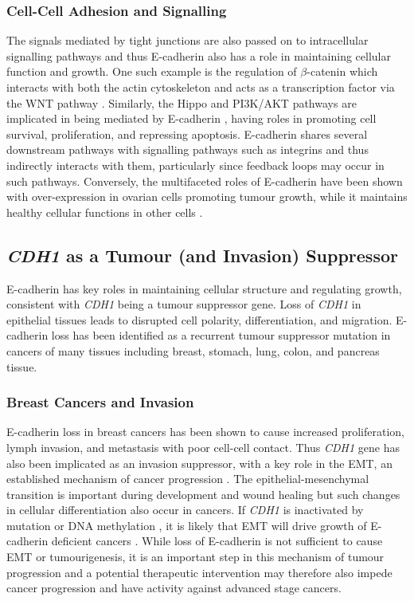 \subsubsection{Cell-Cell Adhesion and Signalling}
The signals mediated by tight junctions are also passed on to intracellular signalling pathways and thus \gls{E-cadherin} also has a role in maintaining cellular function and growth. One such example is the regulation of $\beta$-catenin which interacts with both the actin cytoskeleton and acts as a transcription factor via the \gls{WNT} pathway \citep{Jeanes2008}. Similarly, the Hippo and \gls{PI3K}/AKT pathways are implicated in being mediated by \gls{E-cadherin} \citep{DeSantis2009, Kim2011}, having roles in promoting cell survival, proliferation, and repressing apoptosis. \gls{E-cadherin} shares several downstream pathways with signalling pathways such as integrins and thus indirectly interacts with them, particularly since feedback loops may occur in such pathways. Conversely, the multifaceted roles of \gls{E-cadherin} have been shown with over-expression in ovarian cells promoting tumour growth, while it maintains healthy cellular functions in other cells \citep{Dong2012, Brouxhon2014}.


\subsection{\textit{CDH1} as a Tumour (and Invasion) Suppressor}
\gls{E-cadherin} has key roles in maintaining cellular structure and regulating growth, consistent with \textit{CDH1} being a \gls{tumour suppressor} gene. Loss of \textit{CDH1} in epithelial tissues leads to disrupted cell polarity, differentiation, and  migration. \gls{E-cadherin} loss has been identified as a recurrent  \gls{tumour suppressor} \gls{mutation} in  cancers of many tissues including breast, stomach, lung, colon, and pancreas tissue.

\subsubsection{Breast Cancers and Invasion}
\gls{E-cadherin} loss in breast cancers has been shown to cause increased proliferation, lymph  invasion, and metastasis with poor cell-cell contact. Thus \textit{CDH1} gene has also been implicated as an invasion suppressor, with a key role in the \gls{EMT}, an established mechanism of cancer progression \citep{Hanahan2011}. The epithelial-mesenchymal transition is important during development and wound healing but such changes in cellular differentiation also occur in cancers. If \textit{CDH1} is inactivated by \gls{mutation} or \acrshort{DNA} methylation \citep{Berx1996,Guilford1999,Machado2001}, it is likely that \gls{EMT} will drive growth of \gls{E-cadherin} deficient cancers \citep{Berx2009,Graziano2003,Polyak2009}. While loss of \gls{E-cadherin} is not sufficient to cause \gls{EMT} or tumourigenesis, it is an important step in this mechanism of tumour progression and a potential therapeutic intervention may therefore also impede cancer progression and have activity against advanced stage cancers.

